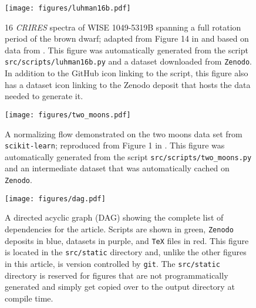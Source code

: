 \documentclass[modern]{aastex631}
\begin{document}
\begin{figure}[p!]
    \begin{centering}
        \texttt{[image: figures/luhman16b.pdf]}
        \caption{
            16 \emph{CRIRES} spectra of WISE 1049-5319B spanning a full rotation period of the brown dwarf; adapted from Figure 14 in \citet{Luger2021} and based on data from \citet{Crossfield2014}.
            This figure was automatically generated from the script \texttt{src/scripts/luhman16b.py} and a dataset downloaded from \texttt{Zenodo}.
            In addition to the GitHub icon linking to the script, this figure also has a dataset icon linking to the Zenodo deposit that hosts the data needed to generate it.
        }
        \label{fig:luhman16b}
    \end{centering}
\end{figure}

\begin{figure}[p!]
    \begin{centering}
        \texttt{[image: figures/two\_moons.pdf]}
        \caption{
            A normalizing flow demonstrated on the two moons data set from \texttt{scikit-learn};
            reproduced from Figure 1 in \citet{Crenshaw2022}.
            This figure was automatically generated from the script \texttt{src/scripts/two\_moons.py}
            and an intermediate dataset that was automatically cached on \texttt{Zenodo}.
        }
        \label{fig:two_moons}
    \end{centering}
\end{figure}



\begin{sidewaysfigure}
    \begin{centering}
        \texttt{[image: figures/dag.pdf]}
        \caption{
            A directed acyclic graph (DAG) showing the complete list of dependencies for the article. 
            Scripts are shown in green, \texttt{Zenodo} deposits in blue, datasets in purple, and \texttt{TeX} files in red.
            This figure is located in the \texttt{src/static} directory and, unlike the other figures in this article, is version controlled by \texttt{git}. The \texttt{src/static} directory is reserved for figures that are not programmatically generated and simply get copied over to the output directory at compile time.
        }
        \label{fig:dag}
    \end{centering}
\end{sidewaysfigure}


\end{document}
